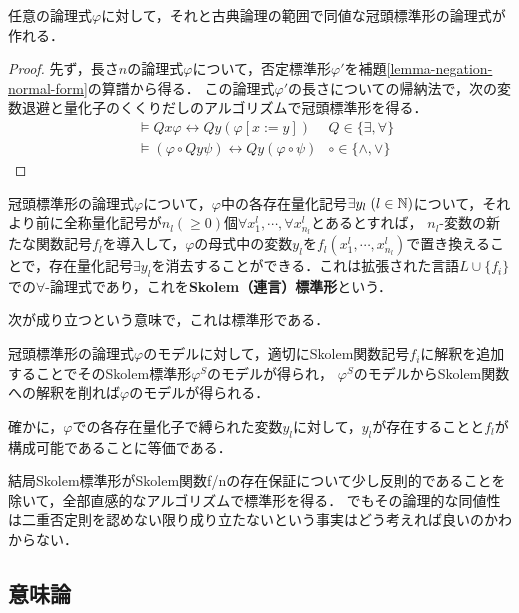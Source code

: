\documentclass[uplatex, 12pt, dvipdfmx]{jsreport}
\begin{document}
\begin{lemma}
    任意の論理式$\varphi$に対して，それと古典論理の範囲で同値な冠頭標準形の論理式が作れる．
\end{lemma}
\begin{proof}
    先ず，長さ$n$の論理式$\varphi$について，否定標準形$\varphi'$を補題\ref{lemma-negation-normal-form}の算譜から得る．
    この論理式$\varphi'$の長さについての帰納法で，次の変数退避と量化子のくくりだしのアルゴリズムで冠頭標準形を得る．
    \begin{align*}
        &\vDash Qx\varphi\leftrightarrow Qy(\varphi[x:=y]) &Q\in\{\exists,\forall\}\\
        &\vDash (\varphi\circ Qy\psi)\leftrightarrow Qy(\varphi\circ\psi) &\circ\in\{\land,\lor\}
    \end{align*}
\end{proof}

\begin{definition}
    冠頭標準形の論理式$\varphi$について，$\varphi$中の各存在量化記号$\exists y_l\;(l\in\mathbb{N})$について，それより前に全称量化記号が$n_l(\ge 0)$個$\forall x_1^l,\cdots,\forall x_{n_l}^l$とあるとすれば，
    $n_l$-変数の新たな関数記号$f_l$を導入して，$\varphi$の母式中の変数$y_l$を$f_l(x^l_1,\cdots,x^l_{n_l})$で置き換えることで，存在量化記号$\exists y_l$を消去することができる．これは拡張された言語$L\cup\{f_i\}$での$\forall$-論理式であり，これを\textbf{Skolem（連言）標準形}という．
\end{definition}
次が成り立つという意味で，これは標準形である．
\begin{proposition}\label{prop-Skolem-normal-form}
    冠頭標準形の論理式$\varphi$のモデルに対して，適切にSkolem関数記号$f_i$に解釈を追加することでそのSkolem標準形$\varphi^S$のモデルが得られ，
    $\varphi^S$のモデルからSkolem関数への解釈を削れば$\varphi$のモデルが得られる．
\end{proposition}
確かに，$\varphi$での各存在量化子で縛られた変数$y_l$に対して，$y_l$が存在することと$f_l$が構成可能であることに等価である．

\begin{screen}
    結局Skolem標準形がSkolem関数f/nの存在保証について少し反則的であることを除いて，全部直感的なアルゴリズムで標準形を得る．
    でもその論理的な同値性は二重否定則を認めない限り成り立たないという事実はどう考えれば良いのかわからない．
\end{screen}

\subsection{意味論}
\end{document}
